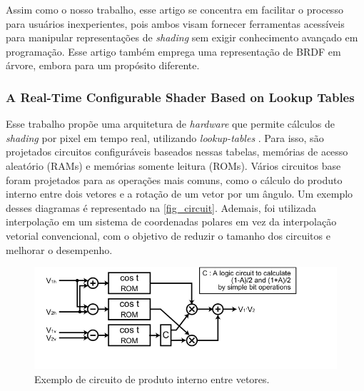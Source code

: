 Assim como o nosso trabalho, esse artigo se concentra em facilitar o processo para usuários inexperientes, pois ambos visam fornecer ferramentas acessíveis para manipular representações de \textit{shading} sem exigir conhecimento avançado em programação. Esse artigo também emprega uma representação de BRDF em árvore, embora para um propósito diferente.


\subsubsection{A Real-Time Configurable Shader Based on Lookup Tables}


Esse trabalho propõe uma arquitetura de \textit{hardware} que permite cálculos de \textit{shading} por pixel em tempo real, utilizando \textit{lookup-tables} \cite{configurable}. Para isso, são projetados circuitos configuráveis baseados nessas tabelas, memórias de acesso aleatório (RAMs) e memórias somente leitura (ROMs). Vários circuitos base foram projetados para as operações mais comuns, como o cálculo do produto interno entre dois vetores e a rotação de um vetor por um ângulo. Um exemplo desses diagramas é representado na \autoref{fig_circuit}. Ademais, foi utilizada interpolação em um sistema de coordenadas polares em vez da interpolação vetorial convencional, com o objetivo de reduzir o tamanho dos circuitos e melhorar o desempenho.





\begin{figure}[H]
        \caption{\label{fig_circuit}\small Exemplo de circuito de produto interno entre vetores.}
        \begin{center}
            \includegraphics[scale=0.7]{./Imagens/rom-cos-lookup-table.png}
        \end{center}
\end{figure}



